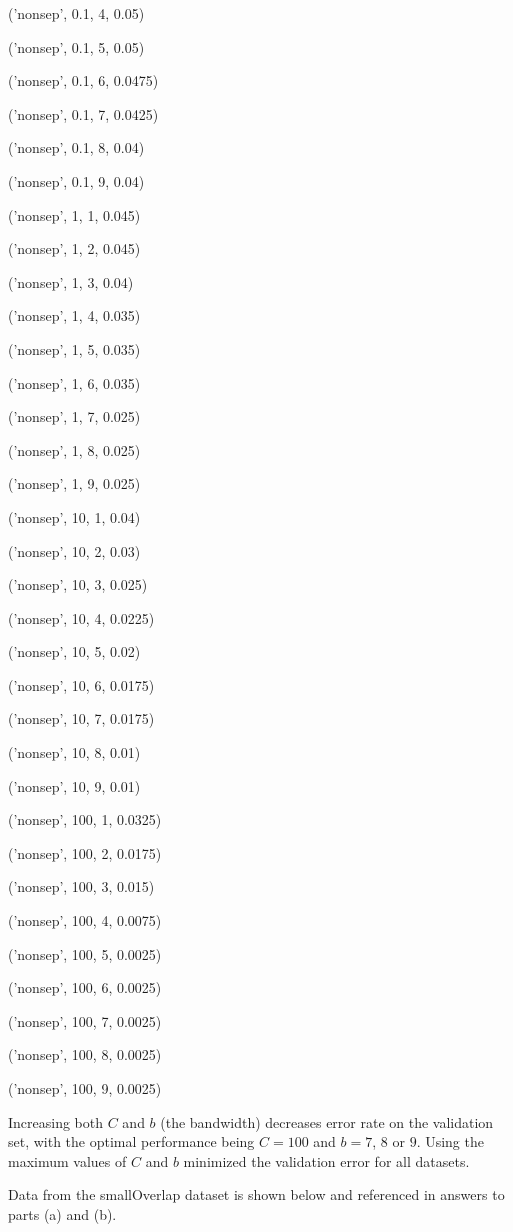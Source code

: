 \documentclass{paper}
\begin{document}
\begin{enumerate}
('nonsep', 0.1, 4, 0.05)

('nonsep', 0.1, 5, 0.05)

('nonsep', 0.1, 6, 0.0475)

('nonsep', 0.1, 7, 0.0425)

('nonsep', 0.1, 8, 0.04)

('nonsep', 0.1, 9, 0.04)

('nonsep', 1, 1, 0.045)

('nonsep', 1, 2, 0.045)

('nonsep', 1, 3, 0.04)

('nonsep', 1, 4, 0.035)

('nonsep', 1, 5, 0.035)

('nonsep', 1, 6, 0.035)

('nonsep', 1, 7, 0.025)

('nonsep', 1, 8, 0.025)

('nonsep', 1, 9, 0.025)

('nonsep', 10, 1, 0.04)

('nonsep', 10, 2, 0.03)

('nonsep', 10, 3, 0.025)

('nonsep', 10, 4, 0.0225)

('nonsep', 10, 5, 0.02)

('nonsep', 10, 6, 0.0175)

('nonsep', 10, 7, 0.0175)

('nonsep', 10, 8, 0.01)

('nonsep', 10, 9, 0.01)

('nonsep', 100, 1, 0.0325)

('nonsep', 100, 2, 0.0175)

('nonsep', 100, 3, 0.015)

('nonsep', 100, 4, 0.0075)

('nonsep', 100, 5, 0.0025)

('nonsep', 100, 6, 0.0025)

('nonsep', 100, 7, 0.0025)

('nonsep', 100, 8, 0.0025)

('nonsep', 100, 9, 0.0025)



    Increasing both $C$ and $b$ (the bandwidth) decreases error rate on the validation set, with the optimal performance being $C=100$ and $b=7$, $8$ or $9$. Using the maximum values of $C$ and $b$ minimized the validation error for all datasets.

    Data from the smallOverlap dataset is shown below and referenced in answers to parts (a) and (b).


\end{enumerate}
\end{document}
